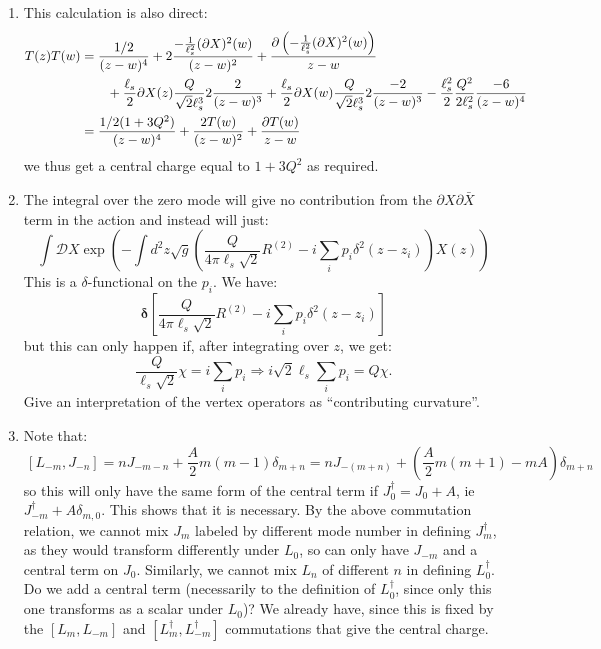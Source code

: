 \documentclass[11pt]{article}
\begin{document}
\begin{enumerate}
	
	\item This calculation is also direct:
	\[
	\begin{aligned}
		T(z) T(w) &= \frac{1/2}{(z-w)^4} + 2\frac{-\frac{1}{\ell_s^2} (\partial X)^2(w)}{(z-w)^2} + \frac{\partial \left(-\frac{1}{\ell_s^2} (\partial X)^2(w)\right)}{z-w} \\
		& \qquad + \frac{\ell_s}{2} \partial X(z) \frac{Q}{\sqrt2 \ell_s^3} 2\frac{2}{(z-w)^3} + \frac{\ell_s}{2} \partial X(w) \frac{Q}{\sqrt2 \ell_s^3} 2\frac{-2}{(z-w)^3} -\frac{\ell_s^2}{2} \frac{Q^2}{2\ell_s^2} \frac{-6}{(z-w)^4}\\
		&= \frac{1/2 (1 + 3 Q^2)}{(z-w)^4} + \frac{2 T(w)}{(z-w)^2} + \frac{\partial T(w)}{z-w}
	\end{aligned}
	\]
	we thus get a central charge equal to $1 + 3 Q^2$ as required. 
	
	\item The integral over the zero mode will give no contribution from the $\partial X \partial \bar X$ term in the action and instead will just:
	\[
		\int \mathcal D X \exp\left(- \int d^2 z \sqrt{g} \left(\frac{ Q}{4 \pi \ell_s \sqrt{2} } R^{(2)} - i \sum_{i} p_i \delta^2(z-z_i) \right) X(z) \right)
	\]
	This is a $\delta$-functional on the $p_i$. We have:
	\[
		\boldsymbol{\delta}\left[ \frac{Q}{4 \pi \ell_s \sqrt{2} } R^{(2)} - i \sum_{i} p_i \delta^2(z-z_i) \right]
	\]
	but this can only happen if, after integrating over $z$, we get:
	\[
		\frac{Q}{\ell_s \sqrt 2} \chi = i \sum_i p_i \Rightarrow i \sqrt{2} \ell_s \sum_i p_i = Q \chi.
	\]
	Give an interpretation of the vertex operators as ``contributing curvature''.
	
	\item Note that:
	\[
		\, [L_{-m}, J_{-n}] = n J_{-m - n} + \frac{A}{2} m (m-1) \delta_{m+n} = n J_{- (m+n)} + \left(\frac{A}{2} m (m+1) - m A\right) \delta_{m+n}
	\]
	so this will only have the same form of the central term if $J_0^\dagger = J_{0} + A$, ie $J_{-m}^\dagger + A \delta_{m, 0}$. This shows that it is necessary. By the above commutation relation, we cannot mix $J_m$ labeled by different mode number in defining $J^{\dagger}_m$, as they would transform differently under $L_0$, so can only have $J_{-m}$ and a central term on $J_0$. Similarly, we cannot mix $L_n$ of different $n$ in defining $L^\dagger_0$. Do we add a central term (necessarily to the definition of $L_0^\dagger$, since only this one transforms as a scalar under $L_0$)? We already have, since this is fixed by the $[L_{m}, L_{-m}]$ and $[L^\dagger_m, L^\dagger_{-m}]$ commutations that give the central charge.
	

\end{enumerate}
\end{document}
